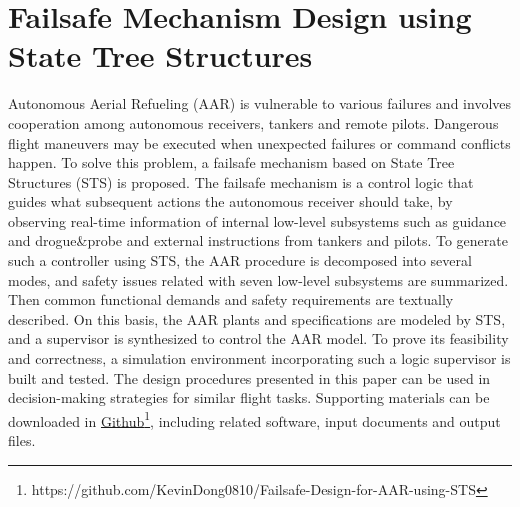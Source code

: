 
\chapter{Failsafe Mechanism Design using State Tree Structures}

Autonomous Aerial Refueling (AAR) is vulnerable to various failures and involves cooperation among autonomous receivers, tankers and remote pilots. Dangerous flight maneuvers may be executed when unexpected failures or command conflicts happen. To solve this problem, a failsafe mechanism based on State Tree Structures (STS) is proposed. The failsafe mechanism is a control logic that guides what subsequent actions the autonomous receiver should take, by observing real-time information of internal low-level subsystems such as guidance and drogue\&probe and external instructions from tankers and pilots. To generate such a controller using STS, the AAR procedure is decomposed into several modes, and safety issues related with seven low-level subsystems are summarized. Then common functional demands and safety requirements are textually described. On this basis, the AAR plants and specifications are modeled by STS, and a supervisor is synthesized to control the AAR model. To prove its feasibility and correctness, a simulation environment incorporating such a logic supervisor is built and tested. The design procedures presented in this paper can be used in decision-making strategies for similar flight tasks. Supporting materials can be downloaded in \href{https://github.com/KevinDong0810/Failsafe-Design-for-AAR-using-STS}{Github}\footnote{https://github.com/KevinDong0810/Failsafe-Design-for-AAR-using-STS}, including related software, input documents and output files.

